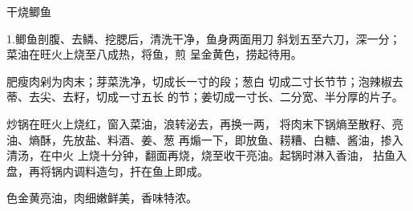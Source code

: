\begin{recipe}{干烧鲫鱼}

\ingredients



\cooking

 1.鲫鱼剖腹、去鳞、挖腮后，清洗干净，鱼身两面用刀 斜划五至六刀，深一分；菜油在旺火上烧至八成热，将鱼，煎 呈金黄色，捞起待用。

\step 肥瘦肉剁为肉末；芽菜洗净，切成长一寸的段；葱白 切成二寸长节节；泡辣椒去蒂、去尖、去籽，切成一寸五长 的节；姜切成一寸长、二分宽、半分厚的片子。

炒锅在旺火上烧红，窗入菜油，浪转泌去，再换一两， 将肉末下锅熵至散籽、亮油、熵酥，先放盐、料酒、姜、葱 再煽一下，即放鱼、耢糟、白糖、酱油，掺入清汤，在中火 上烧十分钟，翻面再烧，烧至收干亮油。起锅时淋入香油， 拈鱼入盘，再将锅内调料造匀，扞在鱼上即成。

\notes

色金黄亮油，肉细嫩鲜美，香味特浓。

\end{recipe}

